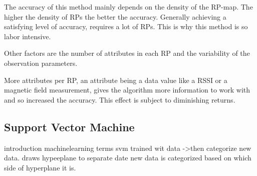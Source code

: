The accuracy of this method mainly depends on the density of the RP-map. The higher the density of RPs the better the accuracy. Generally achieving a satisfying level of accuracy, requires a lot of RPs. This is why this method is so labor intensive.

Other factors are the number of attributes in each RP and the variability of the observation parameters.

More attributes per RP, an attribute being a data value like a RSSI or a magnetic field measurement, gives the algorithm more information to work with and so increased the accuracy\cite{Li2012feasableMagnetic}. This effect is subject to diminishing returns\cite{brouwers2014incremental}.

\subsection{Support Vector Machine}

introduction machinelearning terms
svm trained wit data ->then categorize new data.
draws hypeeplane to separate date
new data is categorized based on which side of hyperplane it is.




